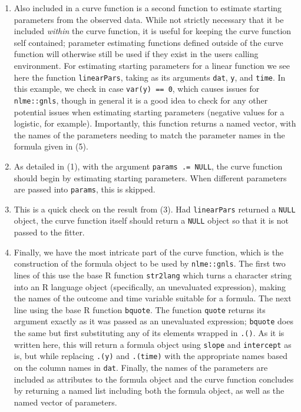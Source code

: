 \documentclass{article}
\newcommand{\xt}{\texttt}%
\begin{document}
\begin{enumerate}
\item Also included in a curve function is a second function to estimate starting parameters from the observed data. While not strictly necessary that it be included \textit{within} the curve function, it is useful for keeping the curve function self contained; parameter estimating functions defined outside of the curve function will otherwise still be used if they exist in the users calling environment. For estimating starting parameters for a linear function we see here the function \xt{linearPars}, taking as  its arguments \xt{dat}, \xt{y}, and \xt{time}. In this example, we check in case \xt{var(y) == 0}, which causes issues for \xt{nlme::gnls}, though in general it is a good idea to check for any other potential issues when estimating starting parameters (negative values for a logistic, for example). Importantly, this function returns a named vector, with the names of the parameters needing to match the parameter names in the formula given in (5). 
\item As detailed in (1), with the argument \xt{params .= NULL}, the curve function should begin by estimating starting parameters. When different parameters are passed into \xt{params}, this is skipped.
\item This is a quick check on the result from (3). Had \xt{linearPars} returned a \xt{NULL} object, the curve function itself should return a \xt{NULL} object so that it is not passed to the fitter.
\item Finally, we have the most intricate part of the curve function, which is the construction of the formula object to be used by \xt{nlme::gnls}. The first two lines of this use the base R function \xt{str2lang} which turns a character string into an R language object (specifically, an unevaluated expression), making the names of the outcome and time variable suitable for a formula. The next line using the base R function \xt{bquote}. The function \xt{quote} returns its argument exactly as it was passed as an unevaluated expression; \xt{bquote} does the same but first substituting any of its elements wrapped in \xt{.()}. As it is written here, this will return a formula object using \xt{slope} and \xt{intercept} as is, but while replacing \xt{.(y)} and \xt{.(time)} with the appropriate names based on the column names in \xt{dat}. Finally, the names of the parameters are included as attributes to the formula object and the curve function concludes by returning a named list including both the formula object, as well as the named vector of parameters.
\end{enumerate}
\end{document}
